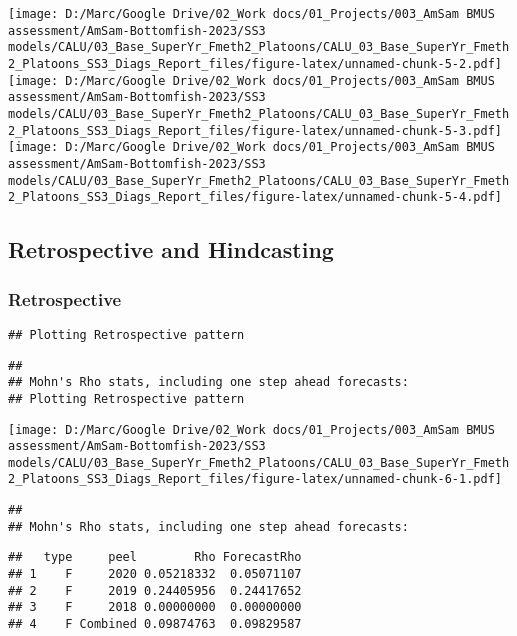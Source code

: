 \documentclass[
]{article}
\begin{document}
\texttt{[image: D:/Marc/Google Drive/02\_Work docs/01\_Projects/003\_AmSam BMUS assessment/AmSam-Bottomfish-2023/SS3 models/CALU/03\_Base\_SuperYr\_Fmeth2\_Platoons/CALU\_03\_Base\_SuperYr\_Fmeth2\_Platoons\_SS3\_Diags\_Report\_files/figure-latex/unnamed-chunk-5-2.pdf]}
\texttt{[image: D:/Marc/Google Drive/02\_Work docs/01\_Projects/003\_AmSam BMUS assessment/AmSam-Bottomfish-2023/SS3 models/CALU/03\_Base\_SuperYr\_Fmeth2\_Platoons/CALU\_03\_Base\_SuperYr\_Fmeth2\_Platoons\_SS3\_Diags\_Report\_files/figure-latex/unnamed-chunk-5-3.pdf]}
\texttt{[image: D:/Marc/Google Drive/02\_Work docs/01\_Projects/003\_AmSam BMUS assessment/AmSam-Bottomfish-2023/SS3 models/CALU/03\_Base\_SuperYr\_Fmeth2\_Platoons/CALU\_03\_Base\_SuperYr\_Fmeth2\_Platoons\_SS3\_Diags\_Report\_files/figure-latex/unnamed-chunk-5-4.pdf]}

\hypertarget{retrospective-and-hindcasting}{%
\subsection{Retrospective and
Hindcasting}\label{retrospective-and-hindcasting}}

\hypertarget{retrospective}{%
\subsubsection{Retrospective}\label{retrospective}}

\begin{verbatim}
## Plotting Retrospective pattern
\end{verbatim}

\begin{verbatim}
## 
## Mohn's Rho stats, including one step ahead forecasts:
## Plotting Retrospective pattern
\end{verbatim}

\texttt{[image: D:/Marc/Google Drive/02\_Work docs/01\_Projects/003\_AmSam BMUS assessment/AmSam-Bottomfish-2023/SS3 models/CALU/03\_Base\_SuperYr\_Fmeth2\_Platoons/CALU\_03\_Base\_SuperYr\_Fmeth2\_Platoons\_SS3\_Diags\_Report\_files/figure-latex/unnamed-chunk-6-1.pdf]}

\begin{verbatim}
## 
## Mohn's Rho stats, including one step ahead forecasts:
\end{verbatim}

\begin{verbatim}
##   type     peel        Rho ForecastRho
## 1    F     2020 0.05218332  0.05071107
## 2    F     2019 0.24405956  0.24417652
## 3    F     2018 0.00000000  0.00000000
## 4    F Combined 0.09874763  0.09829587
\end{verbatim}
\end{document}
